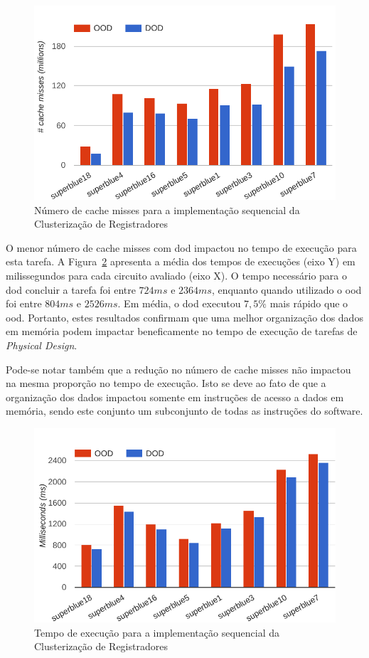 \begin{figure}[ht]
    \centering
    \includegraphics[width=0.7\linewidth]{img/results/missProblemC_sequential_rtree}
    \caption[Cache misses Problema~C versão sequencial]{Número de cache misses para a implementação sequencial da Clusterização de Registradores}
    \label{fig:missProblemC_sequential_rtree}
\end{figure}

O menor número de cache misses com \ac{dod} impactou no tempo de execução para esta tarefa.
A Figura~\ref{fig:runtimeProblemC_sequential_rtree} apresenta a média dos tempos de execuções (eixo Y) em milissegundos para cada circuito avaliado (eixo X).
O tempo necessário para o \ac{dod} concluir a tarefa foi entre $724ms$ e $2364ms$, enquanto quando utilizado o \ac{ood} foi entre $804ms$ e $2526ms$.
Em média, o \ac{dod} executou $7,5\%$ mais rápido que o \ac{ood}.
Portanto, estes resultados confirmam que uma melhor organização dos dados em memória podem impactar beneficamente no tempo de execução de tarefas de \textit{Physical Design}.

Pode-se notar também que a redução no número de cache misses não impactou na mesma proporção no tempo de execução. Isto se deve ao fato de que a organização dos dados impactou somente em instruções de acesso a dados em memória, sendo este conjunto um subconjunto de todas as instruções do software.

\begin{figure}[ht]
    \centering
    \includegraphics[width=0.7\linewidth]{img/results/runtimeProblemC_sequential_rtree}
    \caption[Tempo de execução Problema~C versão sequencial]{Tempo de execução para a implementação sequencial da Clusterização de Registradores}
    \label{fig:runtimeProblemC_sequential_rtree}
\end{figure}

